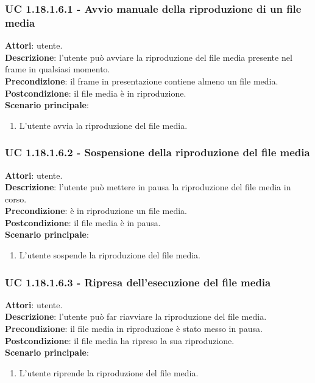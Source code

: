 	\subsubsection{UC 1.18.1.6.1 - Avvio manuale della riproduzione di un file media}{
		\label{uc1.18.1.6.1}
		\textbf{Attori}: utente. \\
		\textbf{Descrizione}: l'utente può avviare la riproduzione del file media presente nel frame in qualsiasi momento. \\
		\textbf{Precondizione}: il frame in presentazione contiene almeno un file media.	\\
		\textbf{Postcondizione}: il file media è in riproduzione.\\
		\textbf{Scenario principale}:
		\begin{enumerate}
			\item L'utente avvia la riproduzione del file media.
		\end{enumerate}
	}
	\subsubsection{UC 1.18.1.6.2 - Sospensione della riproduzione del file media}{
		\label{uc1.18.1.6.2}
		\textbf{Attori}: utente. \\
		\textbf{Descrizione}: l'utente può mettere in pausa la riproduzione del file media in corso. \\
		\textbf{Precondizione}: è in riproduzione un file media.	\\
		\textbf{Postcondizione}: il file media è in pausa.\\
		\textbf{Scenario principale}:
		\begin{enumerate}
			\item L'utente sospende la riproduzione del file media.
		\end{enumerate}		
	}
	\subsubsection{UC 1.18.1.6.3 - Ripresa dell'esecuzione del file media}{
		\label{uc1.18.1.6.3}
		\textbf{Attori}: utente. \\
		\textbf{Descrizione}: l'utente può far riavviare la riproduzione del file media. \\
		\textbf{Precondizione}: il file media in riproduzione è stato messo in pausa.	\\
		\textbf{Postcondizione}: il file media ha ripreso la sua riproduzione.\\
		\textbf{Scenario principale}:
		\begin{enumerate}
			\item L'utente riprende la riproduzione del file media.
		\end{enumerate}		
	}
